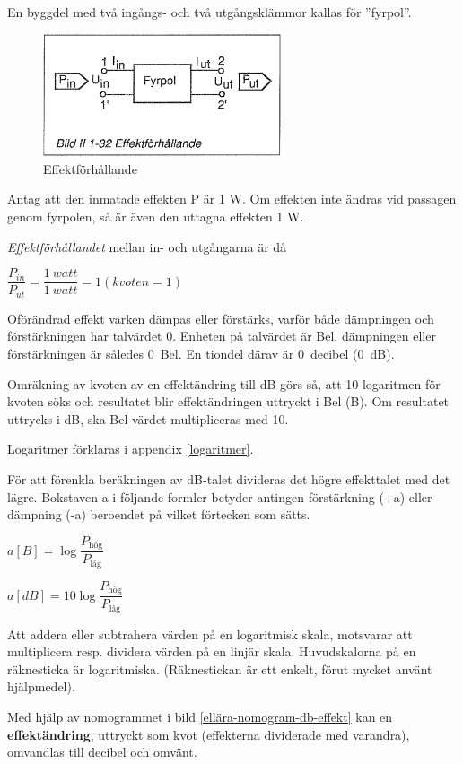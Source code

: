 En byggdel med två ingångs- och två utgångsklämmor kallas för ''fyrpol''.

\begin{figure}[th]
\begin{center}
\includegraphics[width=7cm]{images/bild_2_1-32}
\caption{Effektförhållande}
\label{fig:BildII1-32}
\end{center}
\end{figure}

Antag att den inmatade effekten P är 1 W. Om effekten inte ändras vid passagen
genom fyrpolen, så är även den uttagna effekten 1 W.

\emph{Effektförhållandet} mellan in- och utgångarna är då

\(\dfrac{P_{in}}{P_{ut}} = \dfrac{1\ watt}{1\ watt} = 1 (kvoten = 1)\)

Oförändrad effekt varken dämpas eller förstärks, varför både dämpningen och
förstärkningen har talvärdet 0. Enheten på talvärdet är Bel, dämpningen eller
förstärkningen är således 0~Bel. En tiondel därav är 0~decibel (0~dB).

Omräkning av kvoten av en effektändring till dB görs så, att 10-logaritmen för
kvoten söks och resultatet blir effektändringen uttryckt i Bel (B). Om
resultatet uttrycks i dB, ska Bel-värdet multipliceras med 10.

Logaritmer förklaras i appendix \ref{logaritmer}.

För att förenkla beräkningen av dB-talet divideras det högre effekttalet med det
lägre. Bokstaven a i följande formler betyder antingen förstärkning (+a) eller
dämpning (-a) beroendet på vilket förtecken som sätts.

\(a[B] = \log \dfrac{P_\text{hög}}{P_\text{låg}}\)

\(a[dB] = 10\log \dfrac{P_\text{hög}}{P_\text{låg}}\)

Att addera eller subtrahera värden på en logaritmisk skala, motsvarar att
multiplicera resp. dividera värden på en linjär skala. Huvudskalorna på en
räknesticka är logaritmiska. (Räknestickan är ett enkelt, förut mycket använt
hjälpmedel).

Med hjälp av nomogrammet i bild \ref{ellära-nomogram-db-effekt} kan en \textbf{effektändring}, uttryckt som kvot
(effekterna dividerade med varandra), omvandlas till decibel och omvänt.

